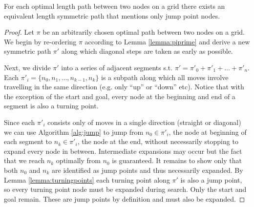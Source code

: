 \begin{theorem}
\label{theorem:jumping}
For each optimal length path between two nodes on a grid there exists
an equivalent length symmetric path that mentions only jump point nodes.
\end{theorem}
\begin{proof}
Let $\pi$ be an arbitrarily chosen optimal path between two nodes
on a grid.  
We begin by re-ordering $\pi$ according to Lemma \ref{lemma:piprime} and derive
a new symmetric path $\pi'$ along which diagonal steps are taken as early as 
possible.
\par
Next, we divide $\pi'$ into a series of adjacent segments s.t. 
$\pi' = \pi'_{0} + \pi'_{1} + \ldots + \pi'_{n} $. Each $\pi'_{i} = \lbrace n_{0}, n_{1},
\ldots, n_{k-1}, n_{k} \rbrace$ is a subpath along which all moves involve
travelling in the same direction (e.g.  only ``up'' or ``down'' etc).  Notice
that with the exception of the start and goal, every node at the beginning and
end of a segment is also a turning point.
\par
Since each $\pi'_{i}$ consists only of moves in a single direction
(straight or diagonal) we can use Algorithm \ref{alg:jump} to jump from $n_{0}
\in \pi'_{i}$, the node at beginning of each segment to $n_{k} \in \pi'_{i}$, the
node at the end, without necessarily stopping to expand every node in between.
Intermediate expansions may occur but the fact that we reach $n_{k}$
optimally from $n_{0}$ is guaranteed.
It remains to show only that both $n_{0}$ and $n_{k}$ are identified as
jump points and thus necessarily expanded. 
By Lemma \ref{lemma:turningpoints} each turning point along $\pi'$ is 
also a jump point, so every turning point node must be expanded during search.
Only the start and goal remain. These are jump points by definition and must
also be expanded.
\end{proof}
